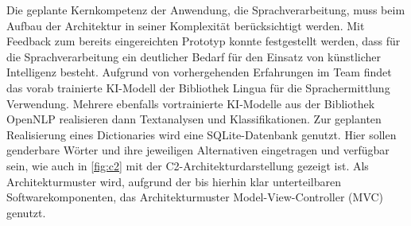 Die geplante Kernkompetenz der Anwendung, die Sprachverarbeitung, muss beim Aufbau der Architektur in seiner Komplexität berücksichtigt werden. Mit Feedback zum bereits eingereichten Prototyp konnte festgestellt werden, dass für die Sprachverarbeitung ein deutlicher Bedarf für den Einsatz von künstlicher Intelligenz besteht. Aufgrund von vorhergehenden Erfahrungen im Team findet das vorab trainierte KI-Modell der Bibliothek Lingua für die Sprachermittlung Verwendung. Mehrere ebenfalls vortrainierte KI-Modelle aus der Bibliothek OpenNLP realisieren dann Textanalysen und Klassifikationen. Zur geplanten Realisierung eines Dictionaries wird eine SQLite-Datenbank genutzt. Hier sollen genderbare Wörter und ihre jeweiligen Alternativen eingetragen und verfügbar sein, wie auch in \ref{fig:c2} mit der C2-Architekturdarstellung gezeigt ist.
Als Architekturmuster wird, aufgrund der bis hierhin klar unterteilbaren Softwarekomponenten, das Architekturmuster Model-View-Controller (MVC) genutzt.